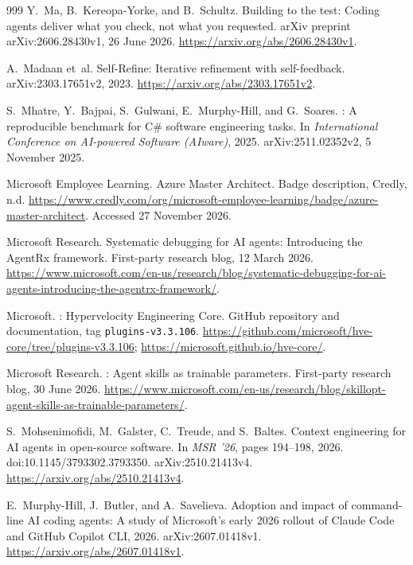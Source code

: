 \documentclass[11pt,a4paper]{article}
\begin{document}
\begin{thebibliography}{999}
Y.~Ma, B.~Kereopa-Yorke, and B.~Schultz.
\newblock Building to the test: Coding agents deliver what you check, not what
you requested.
\newblock arXiv preprint arXiv:2606.28430v1, 26 June 2026.
\newblock \url{https://arxiv.org/abs/2606.28430v1}.

A.~Madaan et~al.
\newblock Self-Refine: Iterative refinement with self-feedback.
\newblock arXiv:2303.17651v2, 2023.
\newblock \url{https://arxiv.org/abs/2303.17651v2}.

S.~Mhatre, Y.~Bajpai, S.~Gulwani, E.~Murphy-Hill, and G.~Soares.
: A reproducible benchmark for {C\#} software
engineering tasks.
\newblock In \emph{International Conference on AI-powered Software (AIware)},
2025. arXiv:2511.02352v2, 5 November 2025.

{Microsoft Employee Learning}.
\newblock Azure Master Architect.
\newblock Badge description, Credly, n.d.
\newblock \url{https://www.credly.com/org/microsoft-employee-learning/badge/azure-master-architect}.
Accessed 27 November 2026.

{Microsoft Research}.
\newblock Systematic debugging for {AI} agents: Introducing the {AgentRx} framework.
\newblock First-party research blog, 12 March 2026.
\newblock \url{https://www.microsoft.com/en-us/research/blog/systematic-debugging-for-ai-agents-introducing-the-agentrx-framework/}.

{Microsoft}.
: Hypervelocity Engineering Core.
\newblock GitHub repository and documentation, tag \texttt{plugins-v3.3.106}.
\newblock \url{https://github.com/microsoft/hve-core/tree/plugins-v3.3.106};
\url{https://microsoft.github.io/hve-core/}.

{Microsoft Research}.
: Agent skills as trainable parameters.
\newblock First-party research blog, 30 June 2026.
\newblock \url{https://www.microsoft.com/en-us/research/blog/skillopt-agent-skills-as-trainable-parameters/}.

S.~Mohsenimofidi, M.~Galster, C.~Treude, and S.~Baltes.
\newblock Context engineering for {AI} agents in open-source software.
\newblock In \emph{MSR '26}, pages 194--198, 2026.
doi:10.1145/3793302.3793350. arXiv:2510.21413v4.
\newblock \url{https://arxiv.org/abs/2510.21413v4}.

E.~Murphy-Hill, J.~Butler, and A.~Savelieva.
\newblock Adoption and impact of command-line {AI} coding agents: A study of
  {Microsoft}'s early 2026 rollout of {Claude Code} and {GitHub Copilot CLI},
  2026.
\newblock arXiv:2607.01418v1\@. \url{https://arxiv.org/abs/2607.01418v1}.


\end{thebibliography}
\end{document}
